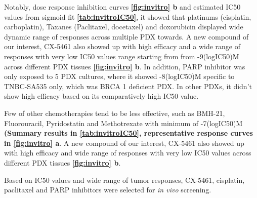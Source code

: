 Notably, dose response inhibition curves \textbf{\autoref{fig:invitro} b} and estimated IC50 values from sigmoid fit \textbf{\autoref{tab:invitroIC50}}, it showed that platinums (cisplatin, carboplatin), Taxanes (Paclitaxel, docetaxel) and doxorubicin displayed wide dynamic range of responses across multiple PDX towards. A new compound of our interest, CX-5461 also showed up with high efficacy and a wide range of responses with very low IC50 values range starting from from -9(logIC50)M across different PDX tissues \textbf{\autoref{fig:invitro} b}. In addition, PARP inhibitor was only exposed to 5 PDX cultures, where it showed -8(logIC50)M specific to TNBC-SA535 only, which was BRCA 1 deficient PDX. In other PDXs, it didn't show high efficacy based on its comparatively high IC50 value.

Few of other chemotherapies tend to be less effective, such as BMH-21, Fluorouracil, Pyridostatin and Methotrexate with minimum of -7(logIC50)M  \textbf{(Summary results in \autoref{tab:invitroIC50}, representative response curves in \autoref{fig:invitro} a}. A new compound of our interest, CX-5461 also showed up with high efficacy and wide range of responses with very low IC50 values across different PDX tissues \textbf{\autoref{fig:invitro} b}. 



Based on IC50 values and wide range of tumor responses,  CX-5461, cisplatin, paclitaxel and PARP inhibitors were selected for \textit{in vivo} screening.

